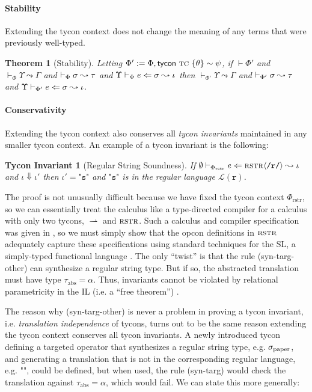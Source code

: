 \documentclass[10pt,preprint]{sigplanconf}
\newtheorem{theorem}{Theorem}
\newtheorem{tyconinvariant}{Tycon Invariant}
\newenvironment{proof-sketch}{\noindent{\emph{Proof Sketch.}}}{\qed}
\begin{document}
\paragraph{Stability}
Extending the tycon context does not change the meaning of any terms that were previously well-typed.
\begin{theorem}[Stability]
Letting $\Phi' := \Phi, {\sf tycon}~\textsc{tc} ~\{\theta\} \sim \psi$, if $\vdash \Phi'$ and $\vdash_\Phi \Upsilon \leadsto \Gamma$ and $\vdash_\Phi \sigma \leadsto \tau$ and $\Upsilon \vdash_{\Phi} e \Leftarrow \sigma \leadsto \iota$ then $\vdash_{\Phi'} \Upsilon \leadsto \Gamma$ and $\vdash_{\Phi'} \sigma \leadsto \tau$ and $\Upsilon \vdash_{\Phi'} e \Leftarrow \sigma \leadsto \iota$.
\end{theorem}

\paragraph{Conservativity} 
Extending the tycon context also conserves all \emph{tycon invariants} maintained in any smaller tycon context. An example of a tycon invariant is the following:

\begin{tyconinvariant}[Regular String Soundness]
If $\emptyset \vdash_{\Phi_\text{rstr}} e \Leftarrow {\textsc{rstr}}\langle\texttt{/r/}\rangle \leadsto \iota$ and $\iota \Downarrow \iota'$ then $\iota'=\texttt{"s"}$ and $\texttt{"s"}$ is in the regular language $\mathcal{L}(\texttt{r})$.
\end{tyconinvariant}
\begin{proof-sketch} The proof is not unusually difficult because we have fixed the tycon context $\Phi_\text{rstr}$, so we can essentially treat the calculus like a type-directed compiler for a calculus with only two tycons, $\rightharpoonup$ and $\textsc{rstr}$. Such a calculus and compiler specification was given in \cite{sanitation-psp14}, so we must simply show that the opcon definitions in $\textsc{rstr}$ adequately capture these specifications using standard techniques for the SL, a simply-typed functional language \cite{conf/pldi/Chlipala07}. The only ``twist'' is that the rule (syn-targ-other) can synthesize a regular string type. But if so, the abstracted translation must have type $\tau_\text{abs}=\alpha$. Thus, invariants cannot be violated by relational parametricity in the IL (i.e. a ``free theorem'') \cite{WadlerThms}. \end{proof-sketch}

The reason why (syn-targ-other) is never a problem in proving a tycon invariant, i.e. \emph{translation independence} of tycons, turns out to be the same reason extending the tycon context conserves all tycon invariants. A newly introduced tycon defining a targeted operator that synthesizes a regular string type, e.g. $\sigma_\text{paper}$, and generating a translation that is not in the corresponding regular language, e.g. $\texttt{""}$, could be defined, but when used, the rule (syn-targ) would check the translation against $\tau_\text{abs}=\alpha$, which would fail. %
 We can state this more generally:
\end{document}
